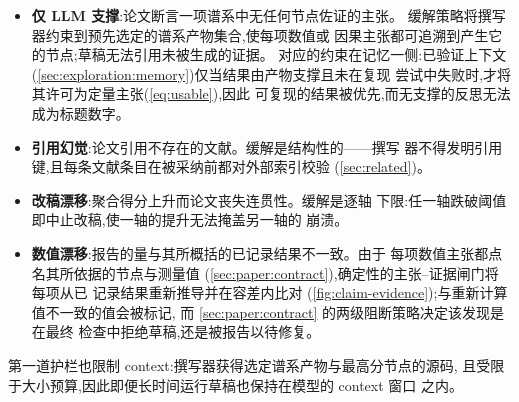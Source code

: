 \begin{itemize}
  \item \textbf{仅 LLM 支撑}:论文断言一项谱系中无任何节点佐证的主张。
        缓解策略将撰写器约束到预先选定的谱系产物集合,使每项数值或
        因果主张都可追溯到产生它的节点;草稿无法引用未被生成的证据。
        对应的约束在记忆一侧:已验证上下文
        (\cref{sec:exploration:memory})仅当结果由产物支撑且未在复现
        尝试中失败时,才将其许可为定量主张(\cref{eq:usable}),因此
        可复现的结果被优先,而无支撑的反思无法成为标题数字。
  \item \textbf{引用幻觉}:论文引用不存在的文献。缓解是结构性的——撰写
        器不得发明引用键,且每条文献条目在被采纳前都对外部索引校验
        (\cref{sec:related})。
  \item \textbf{改稿漂移}:聚合得分上升而论文丧失连贯性。缓解是逐轴
        下限:任一轴跌破阈值即中止改稿,使一轴的提升无法掩盖另一轴的
        崩溃。
  \item \textbf{数值漂移}:报告的量与其所概括的已记录结果不一致。由于
        每项数值主张都点名其所依据的节点与测量值
        (\cref{sec:paper:contract}),确定性的主张--证据闸门将每项从已
        记录结果重新推导并在容差内比对
        (\cref{fig:claim-evidence});与重新计算值不一致的值会被标记,
        而 \cref{sec:paper:contract} 的两级阻断策略决定该发现是在最终
        检查中拒绝草稿,还是被报告以待修复。
\end{itemize}

第一道护栏也限制 context:撰写器获得选定谱系产物与最高分节点的源码,
且受限于大小预算,因此即便长时间运行草稿也保持在模型的 context 窗口
之内。
